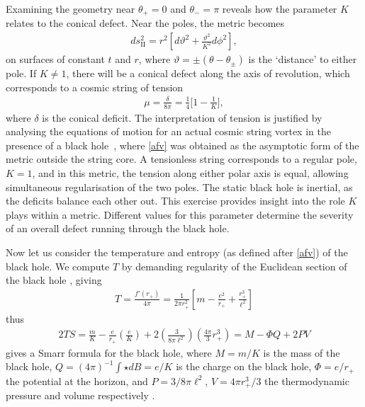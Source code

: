 \documentclass[
twoside,
openright,
frontopenright,
]{dmathesis}
\begin{document}
Examining the geometry near $\theta_+ = 0$ and $\theta_- = \pi$ reveals how the
parameter $K$ relates to the conical defect. Near the poles, the metric becomes
\begin{align}
ds_{\mathrm{II}}^2 = r^2 \left[ d\vartheta^2 + \frac{\vartheta^2}{K^2} d\phi^2\right],
\end{align}
on surfaces of constant $t$ and $r$, where
$\vartheta = \pm (\theta - \theta_\pm)$ is the `distance' to either pole. If
$K\neq 1$, there will be a conical defect along the axis of revolution, which
corresponds to a cosmic string of tension
\begin{align}
\mu = \frac{\delta}{8\pi} = \frac14 \bigg[1-\frac{1}{K}\bigg],
\label{afvtension}
\end{align}
where $\delta$ is the conical deficit. The interpretation of tension is
justified by analysing the equations of motion for an actual cosmic string
vortex in the presence of a black hole~\cite{Achucarro:1995nu}, where
\eqref{afv} was obtained as the asymptotic form of the metric outside the string
core.  A tensionless string corresponds to a regular pole, $K=1$, and in this
metric, the tension along either polar axis is equal, allowing simultaneous
regularisation of the two poles. The static black hole is inertial, as the
deficits balance each other out. This exercise provides insight into the role
$K$ plays within a metric. Different values for this parameter determine the
severity of an overall defect running through the black hole.

Now let us consider the temperature and entropy (as defined after \cref{afv}) of
the black hole. We compute $T$ by demanding regularity of the Euclidean section
of the black hole \cite{Gibbons:1976ue}, giving
\begin{align}
T = \frac{f'(r_+)}{4\pi} = \frac{1}{2\pi r_+^2} \left [
m - \frac{e^2}{r_+} + \frac{r_+^3}{\ell^2}\right]
\end{align}
thus 
\begin{align}
2TS = \frac{m}{K} - \frac{e}{r_+}\left (\frac{e}{K} \right ) 
+ 2\left (\frac{3}{8\pi \ell^2} \right ) \left (\frac{4\pi}{3} r_+^3\right ) 
= M - \Phi Q + 2PV
\end{align}
gives a Smarr formula \cite{Smarr:1972kt} for the black hole, where $M=m/K$ is
the mass of the black hole, $Q = (4\pi)^{-1}
\int \star dB=e/K$ is the charge on the black hole, 
$\Phi = e/r_+$ the potential at the horizon, and $P = 3/8\pi \ell^2$, 
$V = 4\pi r_+^3/3$ the thermodynamic pressure and volume respectively 
\cite{Teitelboim:1985dp,Kastor:2009wy,Dolan:2011xt}.
\end{document}
